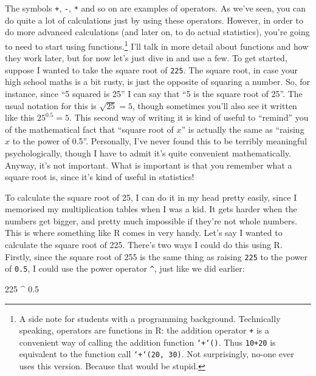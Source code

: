 \documentclass[]{book}
\newenvironment{Shaded}{\begin{snugshade}}{\end{snugshade}}
\newcommand{\DecValTok}[1]{\textcolor[rgb]{0.00,0.00,0.81}{#1}}
\newcommand{\FloatTok}[1]{\textcolor[rgb]{0.00,0.00,0.81}{#1}}
\newcommand{\OperatorTok}[1]{\textcolor[rgb]{0.81,0.36,0.00}{\textbf{#1}}}
\newcommand{\StringTok}[1]{\textcolor[rgb]{0.31,0.60,0.02}{#1}}
\let\rmarkdownfootnote\footnote%
\def\footnote{\protect\rmarkdownfootnote}
\begin{document}
The symbols \texttt{+}, \texttt{-}, \texttt{*} and so on are examples of operators. As we've seen, you can do quite a lot of calculations just by using these operators. However, in order to do more advanced calculations (and later on, to do actual statistics), you're going to need to start using functions.\footnote{A side note for students with a programming background. Technically speaking, operators are functions in R: the addition operator \texttt{+} is a convenient way of calling the addition function \texttt{‘+‘()}. Thus \texttt{10+20} is equivalent to the function call \texttt{‘+‘(20,\ 30)}. Not surprisingly, no-one ever uses this version. Because that would be stupid.} I'll talk in more detail about functions and how they work later, but for now let's just dive in and use a few. To get started, suppose I wanted to take the square root of \texttt{225}. The square root, in case your high school maths is a bit rusty, is just the opposite of squaring a number. So, for instance, since ``5 squared is 25'' I can say that ``5 is the square root of 25''. The usual notation for this is \(\sqrt{25}=5\), though sometimes you'll also see it written like this \(25^{0.5} = 5\). This second way of writing it is kind of useful to ``remind'' you of the mathematical fact that ``square root of \(x\)'' is actually the same as ``raising \(x\) to the power of 0.5''. Personally, I've never found this to be terribly meaningful psychologically, though I have to admit it's quite convenient mathematically. Anyway, it's not important. What is important is that you remember what a square root is, since it's kind of useful in statistics!

To calculate the square root of 25, I can do it in my head pretty easily, since I memorised my multiplication tables when I was a kid. It gets harder when the numbers get bigger, and pretty much impossible if they're not whole numbers. This is where something like R comes in very handy. Let's say I wanted to calculate the square root of 225. There's two ways I could do this using R. Firstly, since the square root of 255 is the same thing as raising \texttt{225} to the power of \texttt{0.5}, I could use the power operator \texttt{\^{}}, just like we did earlier:

\begin{Shaded}
\begin{Highlighting}[]
\DecValTok{225} \OperatorTok{^}\StringTok{ }\FloatTok{0.5}
\end{Highlighting}
\end{Shaded}
\end{document}
